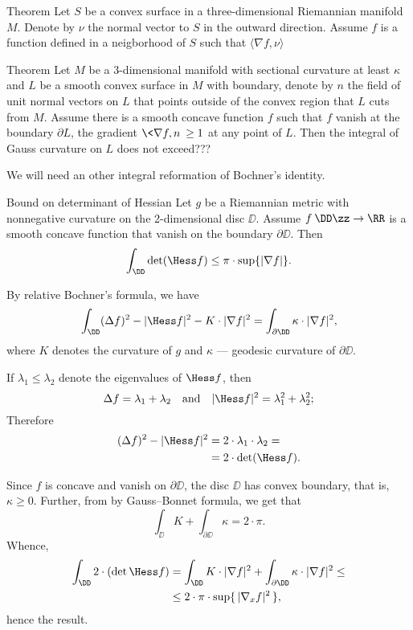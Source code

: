 


\begin{thm}{Theorem}
Let $S$ be a convex surface in a three-dimensional Riemannian manifold $M$.
Denote by $\nu$ the normal vector to $S$ in the outward direction.
Assume $f$ is a function defined in a neigborhood of $S$ such that 
$\langle \nabla f,\nu\rangle$
\end{thm}



\begin{thm}{Theorem}
Let $M$ be a 3-dimensional manifold with sectional curvature at least $\kappa$ and $L$ be a smooth convex surface in $M$ with boundary, denote by $n$ the field of unit normal vectors on $L$ that points outside of the convex region that $L$ cuts from $M$.
Assume there is a smooth concave function $f$ such that $f$ vanish at the boundary $\partial L$,
the gradient $\<\nabla f,n\>\ge 1$ at any point of $L$.
Then the integral of Gauss curvature on $L$ does not exceed???
\end{thm}

We will need an other integral reformation of Bochner's identity.

\begin{thm}{Bound on determinant of Hessian}
Let $g$ be a Riemannian metric with nonnegative curvature on the 2-dimensional disc $\DD$.
Assume $f\:\DD\zz\to \RR$ is a smooth concave function that vanish on the boundary $\partial \DD$.
Then 
\[\int_\DD \det(\Hess f)\le \pi\cdot \sup\{|\nabla f|\}. \]
\end{thm}

By relative Bochner's formula, we have
\[\int_\DD(\Delta f)^2-|\Hess f|^2-K\cdot |\nabla f|^2=\int_{\partial\DD} \kappa\cdot |\nabla f|^2,\]
where $K$ denotes the curvature of $g$ and $\kappa$ --- geodesic curvature of $\partial\DD$.

If $\lambda_1\le \lambda_2$ denote the eigenvalues of $\Hess f$,
then 
\[\Delta f=\lambda_1+\lambda_2\quad\text{and}\quad |\Hess f|^2=\lambda_1^2+\lambda_2^2;\]
Therefore 
\begin{align*}
(\Delta f)^2-|\Hess f|^2&=2\cdot\lambda_1\cdot \lambda_2=
\\
&=2\cdot\det(\Hess f).
\end{align*}

Since $f$ is concave and vanish on $\partial\DD$, the disc $\DD$ has convex boundary, that is, $\kappa\ge 0$.
Further, from by Gauss--Bonnet formula, we get that
\[\int_\DD K+\int_{\partial\DD} \kappa =2\cdot \pi.\]
Whence, 
\begin{align*}
\int_\DD 2\cdot(\det\Hess f)
&=
\int_\DD K\cdot |\nabla f|^2
+
\int_{\partial\DD} \kappa\cdot |\nabla f|^2\le 
\\
&\le 2\cdot \pi \cdot \sup\{\,|\nabla_x f|^2\,\},
\end{align*}
hence the result. 
\qeds